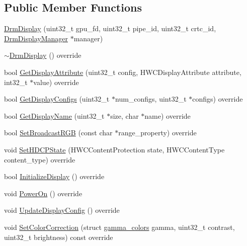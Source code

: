 \subsection*{Public Member Functions}
\begin{DoxyCompactItemize}
\item 
\mbox{\hyperlink{classhwcomposer_1_1DrmDisplay_af465e6d3c061a21372fcc2c1da960e79}{Drm\+Display}} (uint32\+\_\+t gpu\+\_\+fd, uint32\+\_\+t pipe\+\_\+id, uint32\+\_\+t crtc\+\_\+id, \mbox{\hyperlink{classhwcomposer_1_1DrmDisplayManager}{Drm\+Display\+Manager}} $\ast$manager)
\item 
\mbox{\hyperlink{classhwcomposer_1_1DrmDisplay_a10adc5ea0028976604fa467efcfb1880}{$\sim$\+Drm\+Display}} () override
\item 
bool \mbox{\hyperlink{classhwcomposer_1_1DrmDisplay_a7625a0b44daa5be9b7acf1bce235663e}{Get\+Display\+Attribute}} (uint32\+\_\+t config, H\+W\+C\+Display\+Attribute attribute, int32\+\_\+t $\ast$value) override
\item 
bool \mbox{\hyperlink{classhwcomposer_1_1DrmDisplay_a44114f544fbb9328f385085e30d900f1}{Get\+Display\+Configs}} (uint32\+\_\+t $\ast$num\+\_\+configs, uint32\+\_\+t $\ast$configs) override
\item 
bool \mbox{\hyperlink{classhwcomposer_1_1DrmDisplay_ac1feeb5b5c7b1f9dbb0faf1a2bd8befe}{Get\+Display\+Name}} (uint32\+\_\+t $\ast$size, char $\ast$name) override
\item 
bool \mbox{\hyperlink{classhwcomposer_1_1DrmDisplay_abf4285912666230bf6172dae5a867ba7}{Set\+Broadcast\+R\+GB}} (const char $\ast$range\+\_\+property) override
\item 
void \mbox{\hyperlink{classhwcomposer_1_1DrmDisplay_a8ea456de0530370e0ad5f57ba4c6d20a}{Set\+H\+D\+C\+P\+State}} (H\+W\+C\+Content\+Protection state, H\+W\+C\+Content\+Type content\+\_\+type) override
\item 
bool \mbox{\hyperlink{classhwcomposer_1_1DrmDisplay_a6dd7060290f6be414485d743d1e7d226}{Initialize\+Display}} () override
\item 
void \mbox{\hyperlink{classhwcomposer_1_1DrmDisplay_a0212cd45757cc2a74dac62094da103ec}{Power\+On}} () override
\item 
void \mbox{\hyperlink{classhwcomposer_1_1DrmDisplay_aa235de1fc4a01177e1afea36d4554870}{Update\+Display\+Config}} () override
\item 
void \mbox{\hyperlink{classhwcomposer_1_1DrmDisplay_a8da99b54fe8c1261f1bf9a3d00474133}{Set\+Color\+Correction}} (struct \mbox{\hyperlink{structhwcomposer_1_1gamma__colors}{gamma\+\_\+colors}} gamma, uint32\+\_\+t contrast, uint32\+\_\+t brightness) const override

\end{DoxyCompactItemize}
